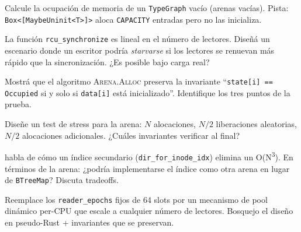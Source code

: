 \begin{ejercicio}[\dificultad{$\star\star$}]
\label{ej:impl-3}
Calcule la ocupación de memoria de un \texttt{TypeGraph} vacío
(arenas vacías). Pista: \texttt{Box<[MaybeUninit<T>]>} aloca
\texttt{CAPACITY} entradas pero no las inicializa.
\end{ejercicio}

\begin{ejercicio}[\dificultad{$\star\star$}]
\label{ej:impl-4}
La función \texttt{rcu\_synchronize} es lineal en el número de
lectores. Diseñá un escenario donde un escritor podría \emph{starvarse}
si los lectores se renuevan más rápido que la sincronización. ¿Es
posible bajo carga real?
\end{ejercicio}

\begin{ejercicio}[\dificultad{$\star\star$}]
\label{ej:impl-5}
Mostrá que el algoritmo \textsc{Arena.Alloc} preserva la invariante
``\texttt{state[i] == Occupied} si y solo si \texttt{data[i]} está
inicializado''. Identifique los tres puntos de la prueba.
\end{ejercicio}

\begin{ejercicio}[\dificultad{$\star\star$}]
\label{ej:impl-6}
Diseñe un test de stress para la arena: $N$ alocaciones, $N/2$
liberaciones aleatorias, $N/2$ alocaciones adicionales. ¿Cuáles
invariantes verificar al final?
\end{ejercicio}

\begin{ejercicio}[\dificultad{$\star\star$}]
\label{ej:impl-7}
 habla de cómo un índice secundario
(\texttt{dir\_for\_inode\_idx}) elimina un O(N\textsuperscript{3}). En
términos de la arena: ¿podría implementarse el índice como otra arena
en lugar de \texttt{BTreeMap}? Discuta tradeoffs.
\end{ejercicio}

\begin{ejercicio}[\dificultad{$\star\star\star$}]
\label{ej:impl-8}
Reemplace los \texttt{reader\_epochs} fijos de 64 slots por un
mecanismo de pool dinámico per-CPU que escale a cualquier número de
lectores. Bosquejo el diseño en pseudo-Rust + invariantes que se
preservan.
\end{ejercicio}
